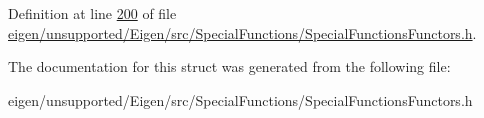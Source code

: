 Definition at line \hyperlink{eigen_2unsupported_2_eigen_2src_2_special_functions_2_special_functions_functors_8h_source_l00200}{200} of file \hyperlink{eigen_2unsupported_2_eigen_2src_2_special_functions_2_special_functions_functors_8h_source}{eigen/unsupported/\+Eigen/src/\+Special\+Functions/\+Special\+Functions\+Functors.\+h}.



The documentation for this struct was generated from the following file\+:\begin{DoxyCompactItemize}
\item 
eigen/unsupported/\+Eigen/src/\+Special\+Functions/\+Special\+Functions\+Functors.\+h\end{DoxyCompactItemize}
